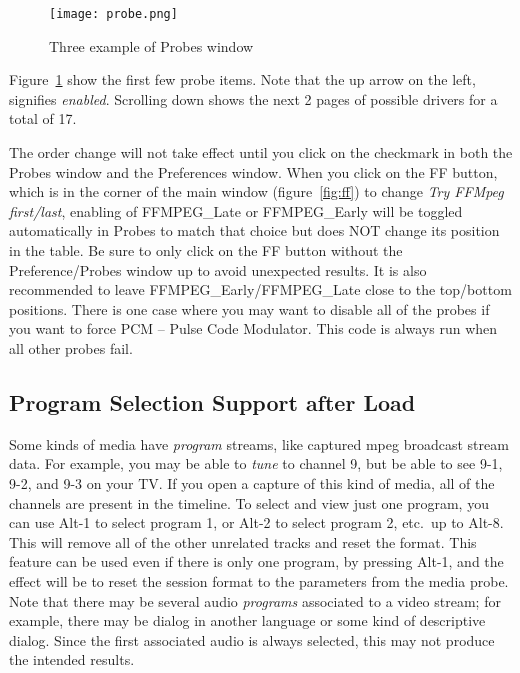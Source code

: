\begin{figure}[htpb]
    \centering
    \texttt{[image: probe.png]}
    \caption{Three example of Probes window}
    \label{fig:probe}
\end{figure}

Figure~\ref{fig:probe} show the first few probe items.  Note that the up arrow on the left, signifies \textit{enabled}.
Scrolling down shows the next 2 pages of possible drivers for a total of 17.

The order change will not take effect until you click on the checkmark in both the Probes window and the Preferences window.  When you click on the FF button, which is in the corner of the main window (figure~\ref{fig:ff}) to change \textit{Try FFMpeg first/last}, enabling of FFMPEG\_Late or FFMPEG\_Early will be toggled automatically in Probes to match that choice but does NOT change its position in the table. Be sure to only click on the FF button without the Preference/Probes window up to avoid unexpected results.  It is also recommended to leave FFMPEG\_Early/FFMPEG\_Late close to the top/bottom positions.  There is one case where you may want to disable all of the probes if you want to force PCM -- Pulse Code Modulator.  This code is always run when all other probes fail.

\subsection{Program Selection Support after Load}%
\label{sub:program_selection_support_load}

Some kinds of media have \textit{program} streams, like captured mpeg broadcast stream data.  For example, you may be able to \textit{tune} to channel 9, but be able to see 9-1, 9-2, and 9-3 on your TV\@.  If you open a capture of this kind of media, all of the channels are present in the timeline.  To select and view just one program, you can use Alt-1 to select program 1, or Alt-2 to select program 2, etc.\ up to Alt-8.  This will remove all of the other unrelated tracks and reset the format.  This feature can be used even if there is only one program, by pressing Alt-1, and the effect will be to reset the session format to the parameters from the media probe.  Note that there may be several audio \textit{programs} associated to a video stream;
for example, there may be dialog in another language or some kind of descriptive dialog.  Since the first associated audio is always selected, this may not produce the intended results.

